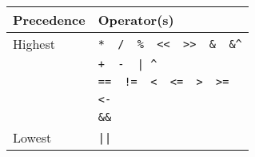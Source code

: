 \begin{tabular}{ll}
\textbf{Precedence} & \textbf{Operator(s)} \\ \midrule
Highest   &	\verb!*  /  %  <<  >>  &  &^!		\\
    &	\verb!+  -  | ^!			\\
    &	\verb+==  !=  <  <=  >  >=+		\\
    &	\verb!<-!				\\
    &	\verb!&&!				\\
Lowest    &	\verb!||!				\\
\end{tabular}
